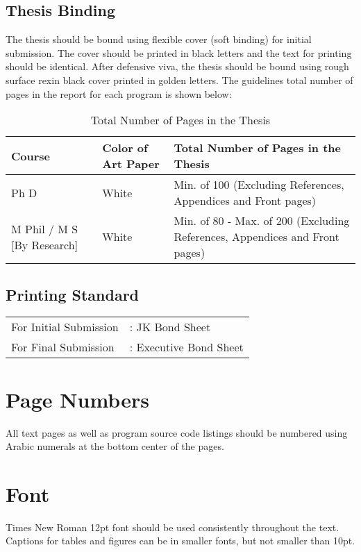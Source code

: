\subsection{Thesis Binding}
The thesis should be bound using flexible cover (soft binding) for initial submission. The cover should be printed in black letters and the text for printing should be identical. After defensive viva, the thesis should be bound using rough surface rexin black cover printed in golden letters. The guidelines total number of pages in the report for each program
is shown below:
\begin{table}[htb]
	\caption{Total Number of Pages in the Thesis}
	\begin{tabular}{|L{3cm}|L{2cm}|L{8cm}|}
		\hline
		Course	& Color of Art Paper & Total Number of Pages 
		in the Thesis \\ \hline
		Ph D &	White &	Min. of 100 (Excluding References, Appendices and Front pages) \\\hline
		M Phil / M S [By Research] & White & Min. of 80 - Max. of  200 (Excluding References, Appendices and Front pages) \\ \hline
	\end{tabular}	
\end{table}

\subsection{Printing Standard}
\begin{table}[htb]
	\begin{tabular}{ll}
		For Initial Submission &: JK Bond Sheet \\
		For Final Submission &: Executive Bond Sheet
		
	\end{tabular}	
\end{table}

\section{Page Numbers}
All text pages as well as program source code listings should be numbered using Arabic numerals at the bottom center of the pages.

\section{Font}
Times New Roman 12pt font should be used consistently throughout the text. Captions for tables and figures can be in smaller fonts, but not smaller than 10pt.

